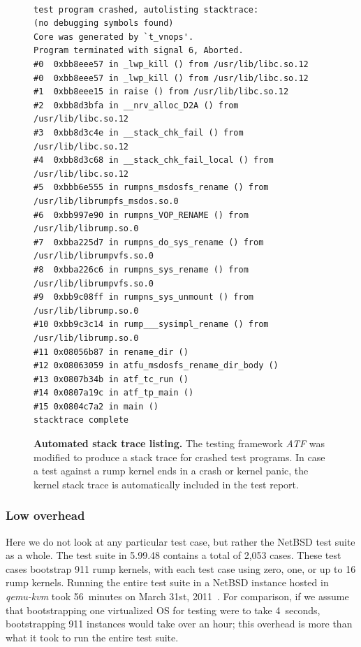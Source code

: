 \begin{figure}[t]
{\tt \scriptsize
\begin{verbatim}
test program crashed, autolisting stacktrace:
(no debugging symbols found)
Core was generated by `t_vnops'.
Program terminated with signal 6, Aborted.
#0  0xbb8eee57 in _lwp_kill () from /usr/lib/libc.so.12
#0  0xbb8eee57 in _lwp_kill () from /usr/lib/libc.so.12
#1  0xbb8eee15 in raise () from /usr/lib/libc.so.12
#2  0xbb8d3bfa in __nrv_alloc_D2A () from /usr/lib/libc.so.12
#3  0xbb8d3c4e in __stack_chk_fail () from /usr/lib/libc.so.12
#4  0xbb8d3c68 in __stack_chk_fail_local () from /usr/lib/libc.so.12
#5  0xbbb6e555 in rumpns_msdosfs_rename () from /usr/lib/librumpfs_msdos.so.0
#6  0xbb997e90 in rumpns_VOP_RENAME () from /usr/lib/librump.so.0
#7  0xbba225d7 in rumpns_do_sys_rename () from /usr/lib/librumpvfs.so.0
#8  0xbba226c6 in rumpns_sys_rename () from /usr/lib/librumpvfs.so.0
#9  0xbb9c08ff in rumpns_sys_unmount () from /usr/lib/librump.so.0
#10 0xbb9c3c14 in rump___sysimpl_rename () from /usr/lib/librump.so.0
#11 0x08056b87 in rename_dir ()
#12 0x08063059 in atfu_msdosfs_rename_dir_body ()
#13 0x0807b34b in atf_tc_run ()
#14 0x0807a19c in atf_tp_main ()
#15 0x0804c7a2 in main ()
stacktrace complete
\end{verbatim}}
\caption[Automated stack trace listing]{
\textbf{Automated stack trace listing.}
The testing framework \textit{ATF} was modified to produce a stack
trace for crashed test programs.  In case a test against a rump kernel
ends in a crash or kernel panic, the kernel stack trace is automatically
included in the test report.
}
\label{fig:msdosstack}
\end{figure}

\subsubsection*{Low overhead}

Here we do not look at any particular test case, but rather the
NetBSD test suite as a whole.  The test suite in 5.99.48 contains
a total of 2,053 cases.  These test cases bootstrap 911 rump kernels,
with each test case using zero, one, or up to 16 rump kernels.
Running the entire test suite in a NetBSD instance hosted in
\textit{qemu-kvm} took 56~minutes on March 31st, 2011~\cite{gson:build}.
For comparison, if we assume that bootstrapping one virtualized OS
for testing were to take 4~seconds, bootstrapping 911 instances
would take over an hour; this overhead is more than what it
took to run the entire test suite.

